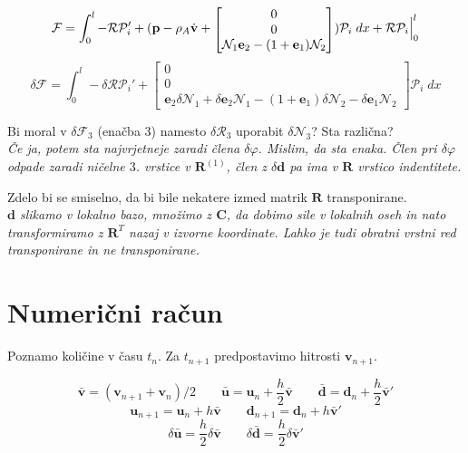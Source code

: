 \documentclass{article}
\begin{document}
$$\mathcal{F} = \int_0^l-\mathcal{R}\mathcal{P}_i' + (\mathbf{p}-\rho_A \dot{\mathbf{v}} + {\scriptscriptstyle \begin{bmatrix} 0\\ 0\\ \mathcal{N}_1\mathbf{e}_2 - (1+\mathbf{e}_1) \mathcal{N}_2 \end{bmatrix}}) \mathcal{P}_i \; dx + \mathcal{R}\mathcal{P}_i\Bigl |_0^l$$
	$$\delta \mathcal{F} = \int_0^l- \delta \mathcal{RP}_i' + {\scriptscriptstyle \begin{bmatrix} 0\\ 0\\ \mathbf{e}_2\delta\mathcal{N}_1+\delta \mathbf{e}_2 \mathcal{N}_1-(1+\mathbf{e}_1)\delta \mathcal{N}_2 - \delta \mathbf{e}_1 \mathcal{N}_2 \end{bmatrix}}\mathcal{P}_i\; dx$$


Bi moral v $\delta\mathcal{F}_3$ (enačba 3) namesto $\delta\mathcal{R}_3$ uporabit $\delta\mathcal{N}_3$? Sta različna?\\
{\it Če ja, potem sta najvrjetneje zaradi člena $\delta\varphi$. Mislim, da sta enaka. Člen pri $\delta\varphi$ odpade zaradi ničelne $3$. vrstice v $\mathbf{R}^{(1)}$, člen z $\delta\mathbf{d}$ pa ima v $\mathbf{R}$ vrstico indentitete.}


Zdelo bi se smiselno, da bi bile nekatere izmed matrik $\mathbf{R}$ transponirane.\\
{\it $\mathbf{d}$ slikamo v lokalno bazo, množimo z $\mathbf{C}$, da dobimo sile v lokalnih oseh in nato transformiramo z $\mathbf{R}^T$ nazaj v izvorne koordinate. Lahko je tudi obratni vrstni red transponirane in ne transponirane.}







\newpage
\section{Numerični račun}
Poznamo količine v času $t_n$. Za $t_{n+1}$ predpostavimo hitrosti $\mathbf{v}_{n+1}$.

$$\bar{\mathbf{v}} = (\mathbf{v}_{n+1} + \mathbf{v}_{n})/2 \qquad \bar{\mathbf{u}} = \mathbf{u}_{n} + \frac{h}{2}\bar{\mathbf{v}} \qquad \bar{\mathbf{d}} = \mathbf{d}_n + \frac{h}{2}\bar{\mathbf{v}}' $$
$$\mathbf{u}_{n+1} = \mathbf{u}_n+h\bar{\mathbf{v}} \qquad \mathbf{d}_{n+1} = \mathbf{d}_n+h\bar{\mathbf{v}}'$$ 
$$ \delta\bar{\mathbf{u}} = \frac{h}{2}\delta\bar{\mathbf{v}} \qquad  \delta\bar{\mathbf{d}} = \frac{h}{2}\delta\bar{\mathbf{v}}'$$ 
\end{document}
